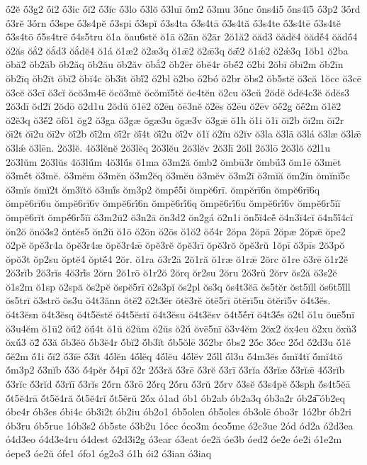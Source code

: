 {ṓ2ĕ
ṓ3g2
ṓi2
ṓ3ic
ṓĭ2
ṓ3ĭc
ṓ3lo
ṓ3lŏ
ṓ3luī
ṓm2
ṓ3mu
3ṓnc
ṓns4i5
ṓns4ĭ5
ṓ3p2
3ṓrd
ṓ3rĕ
3ṓrn
ṓ3spe
ṓ3s4pĕ
ṓ3spi
ṓ3spĭ
ṓ3s4ta
ṓ3s4tā
ṓ3s4tă
ṓ3s4te
ṓ3s4tē
ṓ3s4tĕ
ṓ3s4tō
ṓ5s4trē
ṓ4s5tru
ŏ1a
ŏau6stĕ
ŏ1ā
ŏ2ān
ŏ2ār
2ŏ1ă2
ŏăd3
ŏădĕ4
ŏădĕ́4
ŏădṓ4
ŏ2ăs
ŏắ2
ŏắd3
ŏắdĕ4
ŏ1á
ŏ1æ2
ŏ2æ3q
ŏ1ǣ2
ŏ2ǣ3q
ŏǣ́2
ŏ1ǽ2
ŏ2ǽ3q
1ŏb1
ŏ2ba
ŏbă2
ŏb2ăb
ŏb2ăq
ŏb2ău
ŏb2ăv
ŏbắ2
ŏb2ēr
ŏbĕ4r
ŏbĕ́2
ŏ2bi
2ŏbī
ŏbī2m
ŏb2īn
ŏb2īq
ŏb2īt
ŏbĭ2
ŏbĭ4c
ŏb3ĭt
ŏbĭ́2
ŏ2bl
ŏ2bo
ŏ2bó
ŏ2br
ŏbs2
ŏb5stĕ
ŏ3că
1ŏcc
ŏ3cē
ŏ3cĕ
ŏ3cī
ŏ3cĭ
ŏcŏ3m4ē
ŏcŏ3mĕ
ŏcŏmĭ5tĕ
ŏc4tĕn
ŏ2cu
ŏ3cŭ
2ŏdĕ
ŏdĕ4c3ĕ
ŏdĕs3
2ŏ3dī
ŏd2ĭ
2ŏdō
ŏ2d1u
2ŏdŭ
ŏ1ē2
ŏ2ēn
ŏē3nĕ
ŏ2ēs
ŏ2ēu
ŏ2ēv
ŏḗ2g
ŏḗ2m
ŏ1ĕ2
ŏ2ĕ3q
ŏ3ĕ́2
ŏfŏ1
ŏg2
ŏ3ga
ŏ3gæ
ŏgæ3u
ŏgæ3v
ŏ3gǣ
ŏ1h
ŏ1i
ŏ1ī
ŏī2b
ŏī2m
ŏī2r
ŏī2t
ŏī2u
ŏī2v
ŏī́2b
ŏī́2m
ŏī́2r
ŏī́4t
ŏī́2u
ŏī́2v
ŏ1ĭ
ŏ2ĭu
ŏ2ĭv
ŏ3la
ŏ3lā
ŏ3lá
ŏ3læ
ŏ3lǣ
ŏ3lǽ
ŏ3lēn.
2ŏ3lĕ.
4ŏ3lĕnĕ
2ŏ3lĕq
2ŏ3lĕu
2ŏ3lĕv
2ŏ3lī
2ŏll
2ŏ3lō
2ŏ3lŏ
ŏ2l1u
2ŏ3lŭm
2ŏ3lŭs
4ŏ3lŭ́m
4ŏ3lŭ́s
ŏ1ma
ŏ3m2ă
ŏmb2
ŏmbū3r
ŏmbū́3
ŏm1ē
ŏ3mēt
ŏ3mḗt
ŏ3mĕ.
ŏ3mĕm
ŏ3mĕn
ŏ3m2ĕq
ŏ3mĕu
ŏ3mĕv
ŏ3m2ī
ŏ3mĭă
ŏm2ĭn
ŏmĭnĭ5c
ŏ3mĭs
ŏmĭ2t
ŏm3ĭtŏ
ŏ3mĭ́s
ŏm3p2
ŏmpḗ5i
ŏmpĕ6rī.
ŏmpĕrī6n
ŏmpĕ6rī6q
ŏmpĕ6rī6u
ŏmpĕ6rī6v
ŏmpĕ6rī́6n
ŏmpĕ6rī́6q
ŏmpĕ6rī́6u
ŏmpĕ6rī́6v
ŏmpĕ6r5ĭī
ŏmpĕ6rĭt
ŏmpĕ́6r5ĭī
ŏ3m2ū2
ŏ3n2ā
ŏn3d2
ŏn2gá
ŏ2n1i
ŏn5ĭ4cĕ́
ŏ4n3ĭ4cĭ
ŏ4n5ĭ́4cĭ
ŏn2ŏ
ŏnŏ3s2
ŏntĕs5
ŏn2ŭ
ŏ1ō
ŏ2ōn
ŏ2ōs
ŏ1ŏ2
ŏŏ́4r
2ŏpa
2ŏpā
2ŏpæ
2ŏpǣ
ŏpe2
ŏ2pĕ
ŏpĕ3r4a
ŏpĕ3r4æ
ŏpĕ3r4ǣ
ŏpĕ3rĕ
ŏpĕ3rī
ŏpĕ3rŏ
ŏpĕ3rŭ
1ŏpī
ŏ3pīs
2ŏ3pŏ
ŏpŏ3t
ŏp2su
ŏptĕ4
ŏptĕ́4
2ŏr.
ŏ1ra
ŏ3r2ā
2ŏ1ră
ŏ1ræ
ŏ1rǣ
2ŏrc
ŏ1re
ŏ3rē
ŏ1r2ĕ
2ŏ3rĭb
2ŏ3rĭs
4ŏ3rĭ́s
2ŏrn
2ŏ1rō
ŏ1r2ŏ
2ŏrq
ŏr2su
2ŏru
2ŏ3rŭ
2ŏrv
ŏs2ă
ŏ3s2ĕ
ŏ1s2m
ŏ1sp
ŏ2spă
ŏs2pĕ
ŏspĕ5rī
ŏ2s3pĭ
ŏs2pl
ŏs3q
ŏs4t3ĕā
ŏs5tĕr
ŏst5ĭll
ŏs6t5ĭ́ll
ŏs5trī
ŏ3strŏ
ŏs3u
ŏ4t3ănn
ŏtĕ2
ŏ2t3ĕr
ŏtĕ3rĕ
ŏtĕ5rī
ŏtĕrī5u
ŏtĕrī5v
ŏ4t3ĕs.
ŏ4t3ĕsn
ŏ4t3ĕsq
ŏ4t5ĕstĕ
ŏ4t5ĕstĭ
ŏ4t3ĕsu
ŏ4t3ĕsv
ŏ4t5ĕ́rĭ
ŏ4t3ĕ́s
ŏ2tl
ŏ1u
ŏuē5nī
ŏ3u4ĕm
ŏ1ū2
ŏū́2
ŏū́4t
ŏ1ŭ
ŏ2ŭm
ŏ2ŭs
ŏ2ŭ́
ŏvē5nī
ŏ3v4ĕm
2ŏx2
ŏx4eu
ŏ2xu
ŏxŭ3
ŏxŭ́3
ŏ2́
ŏ́3ă
ŏ́b3ĕŏ
ŏ́b3ĕ4r
ŏ́bĭ2
ŏ́b3ĭt
ŏ́b5ŏlē
3ŏ́2br
ŏ́bs2
2ŏ́c
3ŏ́cc
2ŏ́d
ŏ́2d3u
ŏ́1ĕ
ŏ́ĕ2m
ŏ́1i
ŏ́ĭ2
ŏ́3ĭē
ŏ́3ĭt
4ŏ́lĕn
4ŏ́lĕq
4ŏ́lĕu
4ŏ́lĕv
2ŏ́ll
ŏ́l3u
ŏ́4m3ĕs
ŏ́mĭ4tĭ
ŏ́mĭ4tŏ
ŏ́m3p2
ŏ́3nĭb
ŏ́3ŏ
ŏ́4pĕr
ŏ́4pī
ŏ́2r
2ŏ́3ră
ŏ́3rē
ŏ́3rĕ
ŏ́3rī
ŏ́3rĭa
ŏ́3rĭæ
ŏ́3rĭǣ
4ŏ́3rĭb
ŏ́3rĭc
ŏ́3rĭd
ŏ́3rĭī
ŏ́3rĭs
2ŏ́rn
ŏ́3rō
2ŏ́rq
2ŏ́ru
ŏ́3rŭ
2ŏ́rv
ŏ́3sĕ
ŏ́3s4pĕ
ŏ́3sph
ŏ́s4t5ĕā
ŏ́t5ĕ4rā
ŏ́t5ĕ4ră
ŏ́t5ĕ4rĭ
ŏ́t5ĕrŭ
2ŏ́x
ó1ad
ób1
ób2ab
ób2a3q
ób3a2r
ób2a͡
ób2eq
óbe4r
ób3es
óbi4c
ób3i2t
ób2iu
ób2o1
ób5olen
ób5oles
ób3olē
óbo3r
1ó2br
ób2ri
ób3ru
ób5rue
1ób3s2
ób5ste
ó3b2u
1ócc
óco3m
óco5me
ó2c3ue
2ód
ód2a
ó2d3ea
ó4d3eo
ó4d3e4ru
ó4dest
ó2d3i2g
ó3ear
ó3eat
óe2ă
óe3b
óed2
óe2e
óe2i
ó1e2m
óepe3
óe2ŭ
ófe1
ófo1
óg2o3
ó1h
ói2
ó3ian
ó3iaq
}
